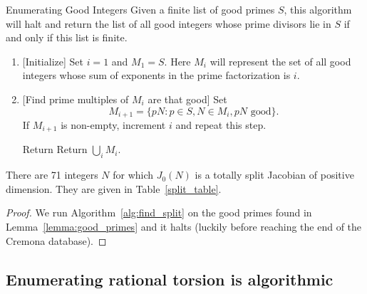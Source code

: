 \documentclass{article}
\begin{document}
\begin{algorithm}{Enumerating Good Integers}
    \label{alg:find_split}
    Given a finite list of good primes $S$, this algorithm will halt and
    return the list of all good integers whose prime divisors lie in $S$
    if and only if this list is finite.
\end{algorithm}
\begin{enumerate}
    \item{} [Initialize] 
        Set $i=1$ and $M_1=S$. Here $M_i$ will represent the set of all good
        integers whose sum of exponents in the prime factorization is $i$.
    \item{} [Find prime multiples of $M_i$ are that good]
        Set
        \[
            M_{i+1}=\{pN: p\in S, N\in M_i, pN \text{ good}\}.
        \]
        If $M_{i+1}$ is non-empty, increment $i$ and repeat this step.
    \item [Return] 
        Return $\bigcup_i M_i$.
\end{enumerate}

\begin{theorem}
    There are 71 integers $N$ for which $J_0(N)$ is a totally split Jacobian of
    positive dimension. They are given in Table~\ref{split_table}.
\end{theorem}
\begin{proof}
    We run Algorithm~\ref{alg:find_split} on the good primes found in
    Lemma~\ref{lemma:good_primes} and it halts (luckily before reaching the end
    of the Cremona database).
\end{proof}


\subsection{Enumerating rational torsion is algorithmic}
\end{document}
